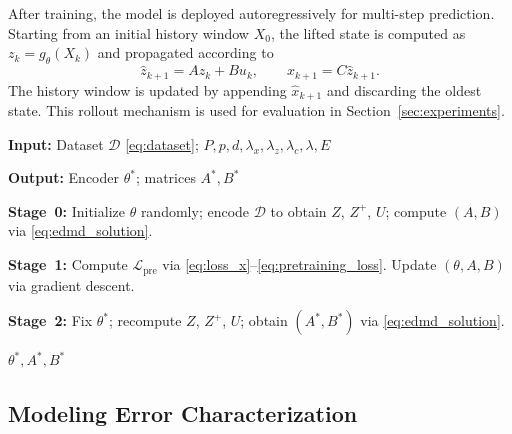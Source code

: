 \documentclass[journal]{IEEEtran}
\begin{document}
After training, the model is deployed autoregressively for multi-step prediction. Starting from an initial history window $X_0$, the lifted state is computed as $z_k = g_\theta(X_k)$ and propagated according to
\begin{equation}
    \hat{z}_{k+1} = A z_k + B u_k, \qquad
    \hat{x}_{k+1} = C \hat{z}_{k+1}.
\end{equation}
The history window is updated by appending $\hat{x}_{k+1}$ and discarding the oldest state. This rollout mechanism is used for evaluation in Section~\ref{sec:experiments}.

\begin{algorithm}[!t]
\caption{Transformer-Koopman Training Algorithm}
\label{alg:training}
\begin{algorithmic}[1]

\STATE \textbf{Input:} Dataset $\mathcal{D}$ \eqref{eq:dataset};
$P, p, d, \lambda_x, \lambda_z, \lambda_c, \lambda, E$

\STATE \textbf{Output:} Encoder $\theta^{*}$; matrices $A^{*}, B^{*}$

\STATE \textbf{Stage~0:}
Initialize $\theta$ randomly; encode $\mathcal{D}$ to obtain
$Z$, $Z^{+}$, $U$; compute $(A,B)$ via \eqref{eq:edmd_solution}.

\vspace{2pt}

\STATE \textbf{Stage~1:}
        \STATE Compute $\mathcal{L}_{\mathrm{pre}}$
               via \eqref{eq:loss_x}--\eqref{eq:pretraining_loss}.
        \STATE Update $(\theta, A, B)$ via gradient descent.
    \ENDFOR
\ENDFOR

\vspace{2pt}

\STATE \textbf{Stage~2:}
Fix $\theta^{*}$; recompute $Z$, $Z^{+}$, $U$;
obtain $(A^{*}, B^{*})$ via \eqref{eq:edmd_solution}.

\RETURN $\theta^{*}, A^{*}, B^{*}$

\end{algorithmic}
\end{algorithm}



\subsection{Modeling Error Characterization}
\label{subsec:modeling_error}
\end{document}
